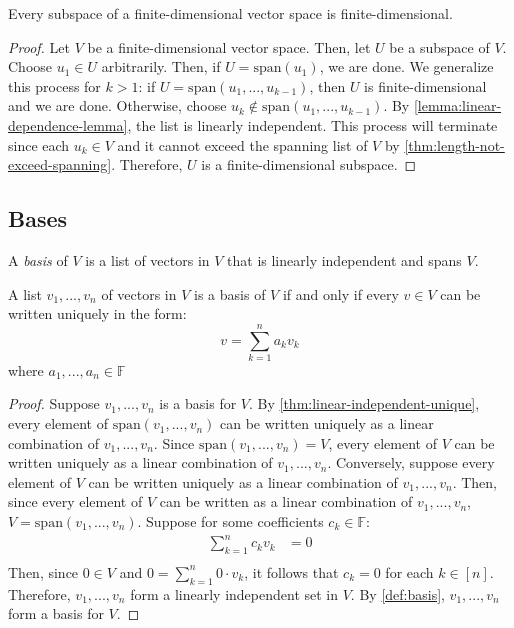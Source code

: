 \documentclass{article}
\begin{document}
\begin{theorem}
  \label{thm:every-subspace-finite-dim}
  Every subspace of a finite-dimensional vector space is finite-dimensional.
\end{theorem}
\begin{proof}
  Let $V$ be a finite-dimensional vector space. Then, let $U$ be a
  subspace of $V$. Choose $u_1 \in U$ arbitrarily. Then, if $U =
  \text{span}(u_1)$, we are done. We generalize this process for $k >
  1$: if $U = \text{span}(u_1, ..., u_{k-1})$, then $U$ is
  finite-dimensional and we are done. Otherwise, choose $u_k \not\in
  \text{span}(u_1, ..., u_{k-1})$. By
  \cref{lemma:linear-dependence-lemma}, the list is linearly
  independent. This process will terminate since each $u_k \in V$ and
  it cannot exceed the spanning list of $V$ by
  \cref{thm:length-not-exceed-spanning}. Therefore, $U$ is a
  finite-dimensional subspace.
\end{proof}

\subsection{Bases}

\begin{definition}
  \label{def:basis}
  A \textit{basis} of $V$ is a list of vectors in $V$ that is linearly
  independent and spans $V$.
\end{definition}
\begin{theorem}
  \label{thm:criterion-for-basis}
  A list $v_1, ..., v_n$ of vectors in $V$ is a basis of $V$ if and
  only if every $v \in V$ can be written uniquely in the form:
  $$v = \sum_{k=1}^n a_k v_k$$
  where $a_1, ..., a_n \in \mathbb{F}$
\end{theorem}
\begin{proof}
  Suppose $v_1,...,v_n$ is a basis for $V$. By
  \cref{thm:linear-independent-unique}, every element of
  $\text{span}(v_1, ..., v_n)$ can be written uniquely as a linear
  combination of $v_1, ..., v_n$. Since
  $\text{span}(v_1, ..., v_n) = V$, every element of $V$ can be
  written uniquely as a linear combination of $v_1, ...,
  v_n$. Conversely, suppose every element of $V$ can be written
  uniquely as a linear combination of $v_1, ..., v_n$. Then, since
  every element of $V$ can be written as a linear combination of $v_1,
  ..., v_n$, $V = \text{span}(v_1, ..., v_n)$. Suppose for some
  coefficients $c_k \in \mathbb{F}$:
  \begin{align*}
	\sum_{k=1}^n c_k v_k &= 0 \\
  \end{align*}
  Then, since $0 \in V$ and $0 = \sum_{k=1}^n 0 \cdot v_k$, it follows
  that $c_k = 0$ for each $k \in [n]$. Therefore, $v_1, ..., v_n$ form
  a linearly independent set in $V$. By \cref{def:basis}, $v_1, ...,
  v_n$ form a basis for $V$.
\end{proof}
\end{document}
